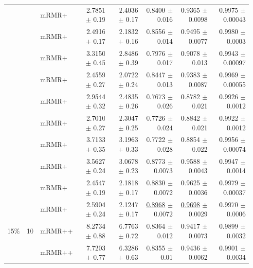 \begin{longtable}{llp{}rrrrr}
 &  & mRMR+ & 2.7851 {\scriptsize $\pm$ 0.19} & 2.4036 {\scriptsize $\pm$ 0.17} & 0.8400 {\scriptsize $\pm$ 0.016} & 0.9365 {\scriptsize $\pm$ 0.0098} & 0.9975 {\scriptsize $\pm$ 0.00043} \\
 &  & mRMR+ & 2.4916 {\scriptsize $\pm$ 0.17} & 2.1832 {\scriptsize $\pm$ 0.16} & 0.8556 {\scriptsize $\pm$ 0.014} & 0.9495 {\scriptsize $\pm$ 0.0077} & 0.9980 {\scriptsize $\pm$ 0.0003} \\
 &  & mRMR+ & 3.3150 {\scriptsize $\pm$ 0.45} & 2.8486 {\scriptsize $\pm$ 0.39} & 0.7976 {\scriptsize $\pm$ 0.017} & 0.9078 {\scriptsize $\pm$ 0.013} & 0.9943 {\scriptsize $\pm$ 0.00097} \\
 &  & mRMR+ & 2.4559 {\scriptsize $\pm$ 0.27} & 2.0722 {\scriptsize $\pm$ 0.24} & 0.8447 {\scriptsize $\pm$ 0.013} & 0.9383 {\scriptsize $\pm$ 0.0087} & 0.9969 {\scriptsize $\pm$ 0.00055} \\
 &  & mRMR+ & 2.9544 {\scriptsize $\pm$ 0.32} & 2.4835 {\scriptsize $\pm$ 0.26} & 0.7673 {\scriptsize $\pm$ 0.026} & 0.8782 {\scriptsize $\pm$ 0.021} & 0.9926 {\scriptsize $\pm$ 0.0012} \\
 &  & mRMR+ & 2.7010 {\scriptsize $\pm$ 0.27} & 2.3047 {\scriptsize $\pm$ 0.25} & 0.7726 {\scriptsize $\pm$ 0.024} & 0.8842 {\scriptsize $\pm$ 0.021} & 0.9922 {\scriptsize $\pm$ 0.0012} \\
 &  & mRMR+ & 3.7133 {\scriptsize $\pm$ 0.35} & 3.1963 {\scriptsize $\pm$ 0.33} & 0.7722 {\scriptsize $\pm$ 0.028} & 0.8854 {\scriptsize $\pm$ 0.022} & 0.9956 {\scriptsize $\pm$ 0.00074} \\
 &  & mRMR+ & 3.5627 {\scriptsize $\pm$ 0.24} & 3.0678 {\scriptsize $\pm$ 0.23} & 0.8773 {\scriptsize $\pm$ 0.0073} & 0.9588 {\scriptsize $\pm$ 0.0043} & 0.9947 {\scriptsize $\pm$ 0.0014} \\
 &  & mRMR+ & 2.4547 {\scriptsize $\pm$ 0.19} & 2.1818 {\scriptsize $\pm$ 0.17} & 0.8830 {\scriptsize $\pm$ 0.0072} & 0.9625 {\scriptsize $\pm$ 0.0036} & 0.9979 {\scriptsize $\pm$ 0.00037} \\
 &  & mRMR+ & 2.5904 {\scriptsize $\pm$ 0.24} & 2.1247 {\scriptsize $\pm$ 0.17} & \underline{0.8968} {\scriptsize $\pm$ 0.0072} & \underline{0.9698} {\scriptsize $\pm$ 0.0029} & 0.9970 {\scriptsize $\pm$ 0.0006} \\
\midrule
15\% & 10 & mRMR++ & 8.2734 {\scriptsize $\pm$ 0.88} & 6.7763 {\scriptsize $\pm$ 0.72} & 0.8364 {\scriptsize $\pm$ 0.012} & 0.9417 {\scriptsize $\pm$ 0.0073} & 0.9899 {\scriptsize $\pm$ 0.0032} \\
 &  & mRMR++ & 7.7203 {\scriptsize $\pm$ 0.77} & 6.3286 {\scriptsize $\pm$ 0.63} & 0.8355 {\scriptsize $\pm$ 0.01} & 0.9436 {\scriptsize $\pm$ 0.0062} & 0.9901 {\scriptsize $\pm$ 0.0034} \\

\end{longtable}
